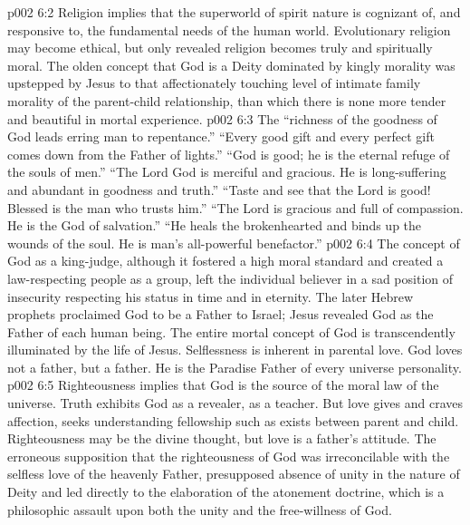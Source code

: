 \vs p002 6:2 Religion implies that the superworld of spirit nature is cognizant of, and responsive to, the fundamental needs of the human world. Evolutionary religion may become ethical, but only revealed religion becomes truly and spiritually moral. The olden concept that God is a Deity dominated by kingly morality was upstepped by Jesus to that affectionately touching level of intimate family morality of the parent\hyp{}child relationship, than which there is none more tender and beautiful in mortal experience.
\vs p002 6:3 \pc The “richness of the goodness of God leads erring man to repentance.” “Every good gift and every perfect gift comes down from the Father of lights.” “God is good; he is the eternal refuge of the souls of men.” “The Lord God is merciful and gracious. He is long\hyp{}suffering and abundant in goodness and truth.” “Taste and see that the Lord is good! Blessed is the man who trusts him.” “The Lord is gracious and full of compassion. He is the God of salvation.” “He heals the brokenhearted and binds up the wounds of the soul. He is man’s all\hyp{}powerful benefactor.”
\vs p002 6:4 \pc The concept of God as a king\hyp{}judge, although it fostered a high moral standard and created a law\hyp{}respecting people as a group, left the individual believer in a sad position of insecurity respecting his status in time and in eternity. The later Hebrew prophets proclaimed God to be a Father to Israel; Jesus revealed God as the Father of each human being. The entire mortal concept of God is transcendently illuminated by the life of Jesus. Selflessness is inherent in parental love. God loves not  a father, but  a father. He is the Paradise Father of every universe personality.
\vs p002 6:5 \pc Righteousness implies that God is the source of the moral law of the universe. Truth exhibits God as a revealer, as a teacher. But love gives and craves affection, seeks understanding fellowship such as exists between parent and child. Righteousness may be the divine thought, but love is a father’s attitude. The erroneous supposition that the righteousness of God was irreconcilable with the selfless love of the heavenly Father, presupposed absence of unity in the nature of Deity and led directly to the elaboration of the atonement doctrine, which is a philosophic assault upon both the unity and the free\hyp{}willness of God.
